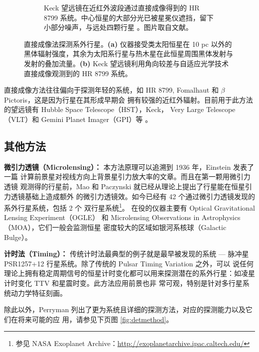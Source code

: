 \begin{figure}[h]
\begin{subfigure}[b]{.48\textwidth}
\caption[Keck 望远镜利用角向较差成像与自适应光学技术在近红外波段通过直接成像得到的 HR 8799 系统。中心恒星的大部分光已被星冕仪遮挡，留下小部分噪声，与远处四颗行星 。图片版权：Marois 等人。]{Keck 望远镜在近红外波段通过直接成像得到的 HR 8799 系统。中心恒星的大部分光已被星冕仪遮挡，留下小部分噪声，与远处四颗行星 。图片取自文献。}
\label{fig:hr8799}
\end{subfigure}
\caption{直接成像法探测系外行星。\textbf{(a)} 仪器接受类太阳恒星在 10 pc 以外的黑体辐射强度，其余为太阳系行星与热木星在此恒星周围黑体发射与发射的叠加流量。\textbf{(b)} Keck 望远镜利用角向较差与自适应光学技术直接成像观测到的 HR 8799 系统。}
\label{fig:directimage} 
\end{figure}

直接成像方法往往偏向于探测年轻的系统，如 HR 8799\cite{Marois2008HR8799}, 
Fomalhaut\cite{Kalas2008} 和 $\beta$ Pictoris\cite{Lagrange2010}，这是因为行星在其形成早期会
拥有较强的近红外辐射。目前用于此方法的望远镜有 Hubble Space Telescope（HST），Keck，
Very Large Telescope（VLT）和 Gemini Planet Imager（GPI）等
\cite{Marois2008HR8799,Chauvin2005,Macintosh2014}。

\subsection{其他方法}
\textbf{微引力透镜（Microlensing）：} 本方法原理可以追溯到 1936 年，Einstein 发表了一篇
计算前景星对视线方向上背景星引力放大率的文章\cite{Einstein1936}。而且在第一颗用微引力透镜
观测得的行星前，Mao 和  Paczynski 就已经从理论上提出了行星能在恒星引力透镜基础上造成额外
的微引力透镜效\cite{Mao1991}。如今已经有 42 个通过微引力透镜发现的系外行星系统，包括 2 个
双行星系统\footnote{参见 NASA Exoplanet Archive：\url{http://exoplanetarchive.ipac.caltech.edu/}}。
在役的仪器主要有 Optical Gravitational Lensing Experiment（OGLE）\cite{Udalskietal2002OGLE} 
和 Microlensing Observations in Astrophysics（MOA）\cite{Bond2004MOA}，它们一般会监测恒星
密度较大的区域如银河系核球（Galactic Bulge）。

\textbf{计时法（Timing）：} 传统计时法最典型的例子就是最早被发现的系统 --- 脉冲星 
PSR1257+12 行星系统\cite{WolszczanFrail1992}。除了传统的 Pulsar Timing Variation 之外，可以
说任何理论上拥有稳定周期信号的恒星计时变化都可以用来探测潜在的系外行星：如凌星计时变化 
TTV\cite{Ford2011TTV,Xie2013} 和星震时变\cite{Silvotti2007,Murphy2016}。此方法应用前景也非
常可观，特别是针对多行星系统动力学特征刻画\cite{HolmanMurray2005}。

除此以外，Perryman 列出了更为系统且详细的探测方法，对应的探测能力以及它们在将来可能的应
用\cite{Perryman2000}，请参见下页图 \ref{fig:detmethod}。

